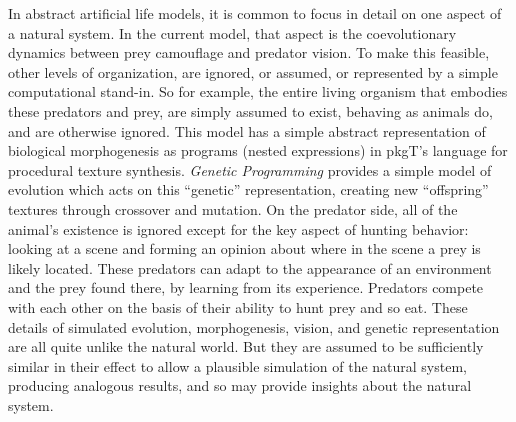 \documentclass[letterpaper]{article}
\newcommand{\jargon}[1]{\textit{#1}}
\newcommand{\texsyn}[0]{pkgT}
\begin{document}
In abstract artificial life models, it is common to focus in detail on one aspect of a natural system. In the current model, that aspect is the coevolutionary dynamics between prey camouflage and predator vision. To make this feasible, other levels of organization, are ignored, or assumed, or represented by a simple computational stand-in. So for example, the entire living organism that embodies these predators and prey, are simply assumed to exist, behaving as animals do, and are otherwise ignored. This model has a simple abstract representation of biological morphogenesis as programs (nested expressions) in \texsyn{}'s language for procedural texture synthesis. \jargon{Genetic Programming} provides a simple model of evolution which acts on this “genetic” representation, creating new “offspring” textures through crossover and mutation. On the predator side, all of the animal's existence is ignored except for the key aspect of hunting behavior: looking at a scene and forming an opinion about where in the scene a prey is likely located. These predators can adapt to the appearance of an environment and the prey found there, by learning from its experience. Predators compete with each other on the basis of their ability to hunt prey and so eat. These details of simulated evolution, morphogenesis, vision, and genetic representation are all quite unlike the natural world. But they are assumed to be sufficiently similar in their effect to allow a plausible simulation of the natural system, producing analogous results, and so may provide insights about the natural system.
\par


\end{document}

